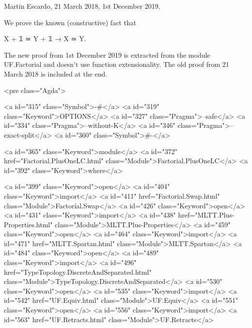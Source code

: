 Martin Escardo, 21 March 2018, 1st December 2019.

We prove the known (constructive) fact that

  X + 𝟙 ≃ Y + 𝟙 → X ≃ Y.

The new proof from 1st December 2019 is extracted from the module
UF.Factorial and doesn't use function extensionality. The old proof
from 21 March 2018 is included at the end.

<pre class="Agda">

<a id="315" class="Symbol">{-#</a> <a id="319" class="Keyword">OPTIONS</a> <a id="327" class="Pragma">--safe</a> <a id="334" class="Pragma">--without-K</a> <a id="346" class="Pragma">--exact-split</a> <a id="360" class="Symbol">#-}</a>

<a id="365" class="Keyword">module</a> <a id="372" href="Factorial.PlusOneLC.html" class="Module">Factorial.PlusOneLC</a> <a id="392" class="Keyword">where</a>

<a id="399" class="Keyword">open</a> <a id="404" class="Keyword">import</a> <a id="411" href="Factorial.Swap.html" class="Module">Factorial.Swap</a>
<a id="426" class="Keyword">open</a> <a id="431" class="Keyword">import</a> <a id="438" href="MLTT.Plus-Properties.html" class="Module">MLTT.Plus-Properties</a>
<a id="459" class="Keyword">open</a> <a id="464" class="Keyword">import</a> <a id="471" href="MLTT.Spartan.html" class="Module">MLTT.Spartan</a>
<a id="484" class="Keyword">open</a> <a id="489" class="Keyword">import</a> <a id="496" href="TypeTopology.DiscreteAndSeparated.html" class="Module">TypeTopology.DiscreteAndSeparated</a>
<a id="530" class="Keyword">open</a> <a id="535" class="Keyword">import</a> <a id="542" href="UF.Equiv.html" class="Module">UF.Equiv</a>
<a id="551" class="Keyword">open</a> <a id="556" class="Keyword">import</a> <a id="563" href="UF.Retracts.html" class="Module">UF.Retracts</a>

